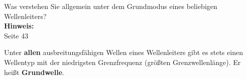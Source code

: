 \begin{question}[section=4,name={Grundmodus allgemein},difficulty=,quantity=5,type=thr,tags={20151210}]
	Was verstehen Sie allgemein unter dem Grundmodus eines beliebigen Wellenleiters?
	\\ \textbf{Hinweis:}\\
	Seite 43
\end{question}
\begin{solution}
	Unter \textbf{allen} ausbreitungsfähigen Wellen eines Wellenleiters gibt es stets einen Wellentyp mit der niedrigsten Grenzfrequenz (größten Grenzwellenlänge). Er heißt \textbf{Grundwelle}.
\end{solution}